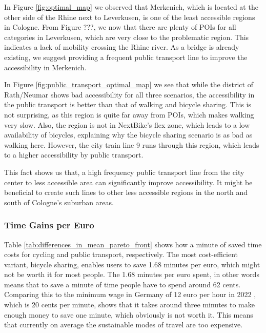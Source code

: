 In Figure \ref{fig:optimal_map} we observed that Merkenich, which is located at the other side of the Rhine next to Leverkusen, is one of the least accessible regions in Cologne.
From Figure ???, we now that there are plenty of POIs for all categories in Leverkusen, which are very close to the problematic region.
This indicates a lack of mobility crossing the Rhine river.
As a bridge is already existing, we suggest providing a frequent public transport line to improve the accessibility in Merkenich.

In Figure \ref{fig:public_transport_optimal_map} we see that while the district of Rath/Neumar shows bad accessibility for all three scenarios, the accessibility in the public transport is better than that of walking and bicycle sharing.
This is not surprising, as this region is quite far away from POIs, which makes walking very slow.
Also, the region is not in NextBike's flex zone, which leads to a low availability of bicycles, explaining why the bicycle sharing scenario is as bad as walking here.
However, the city train line 9 runs through this region, which leads to a higher accessibility by public transport.

This fact shows us that, a high frequency public transport line from the city center to less accessible area can significantly improve accessibility.
It might be beneficial to create such lines to other less accessible regions in the north and south of Cologne's suburban areas.


\subsubsection{Time Gains per Euro}

Table \ref{tab:differences_in_mean_pareto_front} shows how a minute of saved time costs for cycling and public transport, respectively.
The most cost-efficient variant, bicycle sharing, enables users to save 1.68 minutes per euro, which might not be worth it for most people.
The 1.68 minutes per euro spent, in other words means that to save a minute of time people have to spend around 62 cents.
Comparing this to the minimum wage in Germany of 12 euro per hour in 2022 \cite{federalstatisticalofficegermanyMinimumWages}, which is 20 cents per minute, shows that it takes around three minutes to make enough money to save one minute, which obviously is not worth it.
This means that currently on average the sustainable modes of travel are too expensive.

